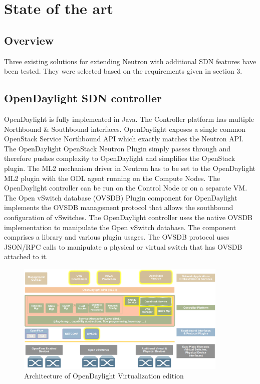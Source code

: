 \chapter{State of the art}

\section{Overview}

Three existing solutions for extending Neutron with additional SDN features have been tested. They were selected based on the requirements given in section 3.

\section{OpenDaylight SDN controller}


OpenDaylight is fully implemented in Java. The Controller platform has multiple Northbound \& Southbound interfaces. OpenDaylight exposes a single common OpenStack Service Northbound API which exactly matches the Neutron API. The OpenDaylight OpenStack Neutron Plugin simply passes through and therefore pushes complexity to OpenDaylight and simplifies the OpenStack plugin. The ML2 mechanism driver in Neutron has to be set to the OpenDaylight ML2 plugin with the ODL agent running on the Compute Nodes. The OpenDaylight controller can be run on the Control Node or on a separate VM. The Open vSwitch database (OVSDB) Plugin component for OpenDaylight implements the OVSDB management protocol that allows the southbound configuration of vSwitches. The OpenDaylight controller uses the native OVSDB implementation to manipulate the Open vSwitch database. The component comprises a library and various plugin usages. The OVSDB protocol uses JSON/RPC calls to manipulate a physical or virtual switch that has OVSDB attached to it.

\begin{figure}[H]
\centering
\includegraphics[width=0.9\textwidth]{images/sota/odl_architecture.png}
\caption{Architecture of OpenDaylight Virtualization edition}
\end{figure}

